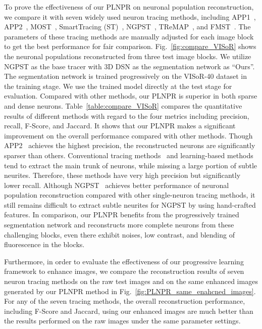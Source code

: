 To prove the effectiveness of our PLNPR on neuronal population reconstruction, we compare it with seven widely used neuron tracing methods, including APP1~\cite{Peng2011}, APP2~\cite{Xiao2013}, MOST~\cite{Wu2014}, SmartTracing (ST)~\cite{Chen2015}, NGPST~\cite{Quan2015}, TReMAP~\cite{Zhou2016}, and FMST~\cite{Yang2019}.
The parameters of these tracing methods are manually adjusted for each image block to get the best performance for fair comparison.
%
Fig.~\ref{fig:compare_VISoR} shows the neuronal populations reconstructed from three test image blocks.
We utilize NGPST as the base tracer with 3D DSN as the segmentation network as ``Ours''. 
The segmentation network is trained progressively on the VISoR-40 dataset in the training stage. 
We use the trained model directly at the test stage for evaluation. 
Compared with other methods, our PLNPR is superior in both sparse and dense neurons.
%
Table~\ref{table:compare_VISoR} compares the quantitative results of different methods with regard to the four metrics including precision, recall, F-Score, and Jaccard.
%
It shows that our PLNPR makes a significant improvement on the overall performance compared with other methods.
Though APP2~\cite{Xiao2013} achieves the highest precision, the reconstructed neurons are significantly sparser than others.
%
Conventional tracing methods~\cite{Peng2011, Xiao2013, Wu2014, Zhou2016} and learning-based methods~\cite{Chen2015, Yang2019} tend to extract the main trunk of neurons, while missing a large portion of subtle neurites. 
Therefore, these methods have very high precision but significantly lower recall.
Although NGPST~\cite{Quan2015} achieves better performance of neuronal population reconstruction compared with other single-neuron tracing methods, it still remains difficult to extract subtle neurites for NGPST by using hand-crafted features.
%
In comparison, our PLNPR benefits from the progressively trained segmentation network and reconstructs more complete neurons from these challenging blocks, even there exhibit noises, low contrast, and blending of fluorescence in the blocks.
%


Furthermore, in order to evaluate the effectiveness of our progressive learning framework to enhance images, we compare the reconstruction results of seven neuron tracing methods on the raw test images and on the same enhanced images generated by our PLNPR method in Fig.~\ref{fig:PLNPR_same_enahcned_images}.
For any of the seven tracing methods, the overall reconstruction performance, including F-Score and Jaccard, using our enhanced images are much better than the results performed on the raw images under the same parameter settings.

